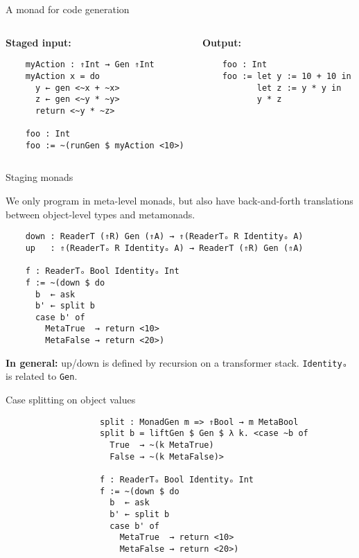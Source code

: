 \documentclass[dvipsnames,aspectratio=169]{beamer}
\newcommand{\ttt}[1]{{\texttt{#1}}}
\theoremstyle{remark}
\begin{document}
\begin{frame}[fragile]{A monad for code generation}

\begin{columns}
\begin{column}{0.4\textwidth}
\textbf{Staged input:}
\begin{verbatim}
    myAction : ⇑Int → Gen ⇑Int
    myAction x = do
      y ← gen <~x + ~x>
      z ← gen <~y * ~y>
      return <~y * ~z>

    foo : Int
    foo := ~(runGen $ myAction <10>)
\end{verbatim}
\end{column}
\begin{column}{0.5\textwidth}
\textbf{Output:}
\begin{verbatim}
    foo : Int
    foo := let y := 10 + 10 in
           let z := y * y in
           y * z




\end{verbatim}
\end{column}
\end{columns}

\end{frame}

\begin{frame}[fragile]{Staging monads}

We only program in meta-level monads, but also have back-and-forth
translations between object-level types and metamonads.

\begin{verbatim}
    down : ReaderT (⇑R) Gen (⇑A) → ⇑(ReaderTₒ R Identityₒ A)
    up   : ⇑(ReaderTₒ R Identityₒ A) → ReaderT (⇑R) Gen (⇑A)

    f : ReaderTₒ Bool Identityₒ Int
    f := ~(down $ do
      b  ← ask
      b' ← split b
      case b' of
        MetaTrue  → return <10>
        MetaFalse → return <20>)
\end{verbatim}

\begin{block}{}
\textbf{In general:} up/down is defined by recursion on a transformer stack.
\alert{\ttt{Identityₒ} is related to \ttt{Gen}.}
\end{block}
\end{frame}

\begin{frame}[fragile]{Case splitting on object values}

\begin{verbatim}
                   split : MonadGen m => ⇑Bool → m MetaBool
                   split b = liftGen $ Gen $ λ k. <case ~b of
                     True  → ~(k MetaTrue)
                     False → ~(k MetaFalse)>

                   f : ReaderTₒ Bool Identityₒ Int
                   f := ~(down $ do
                     b  ← ask
                     b' ← split b
                     case b' of
                       MetaTrue  → return <10>
                       MetaFalse → return <20>)
\end{verbatim}

\end{frame}
\end{document}

